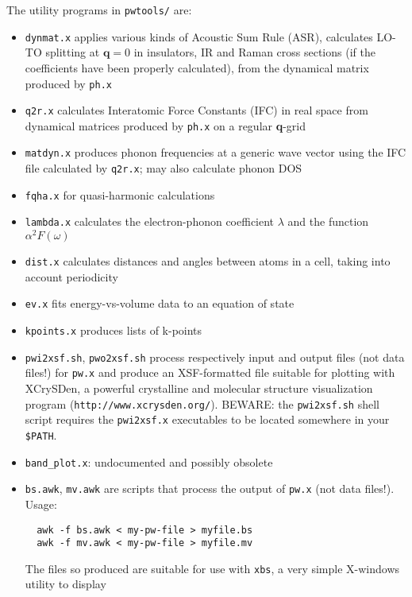 \documentclass[12pt,a4paper]{article}
\begin{document}
The utility programs in \texttt{pwtools/} are:
\begin{itemize}
  \item \texttt{dynmat.x} applies various kinds of Acoustic Sum Rule
        (ASR), calculates LO-TO splitting at $\mathbf{q}=0$ in 
        insulators, IR and Raman cross sections (if the coefficients
        have been properly calculated), from the dynamical matrix
        produced by \texttt{ph.x}
  \item \texttt{q2r.x} calculates Interatomic Force Constants (IFC) in
        real space from dynamical matrices produced by
        \texttt{ph.x} on a regular \textbf{q}-grid
  \item \texttt{matdyn.x} produces phonon frequencies at a generic
        wave vector using the IFC file calculated by \texttt{q2r.x}; 
        may also calculate phonon DOS
  \item \texttt{fqha.x} for quasi-harmonic calculations
  \item \texttt{lambda.x} calculates the electron-phonon coefficient
        $\lambda$ and the function $\alpha^2F(\omega)$
  \item \texttt{dist.x} calculates distances and angles between
        atoms in a cell, taking into account periodicity
  \item \texttt{ev.x} fits energy-vs-volume data to an equation of
        state
  \item \texttt{kpoints.x} produces lists of k-points
  \item \texttt{pwi2xsf.sh}, \texttt{pwo2xsf.sh} process
        respectively input and output files (not data files!) for
        \texttt{pw.x} and produce an XSF-formatted file suitable
        for plotting with XCrySDen, a powerful crystalline and
        molecular structure visualization program 
        (\texttt{http://www.xcrysden.org/}).
        BEWARE: the \texttt{pwi2xsf.sh} shell script requires the
        \texttt{pwi2xsf.x} executables to be located somewhere in
        your \texttt{\$PATH}.
  \item \texttt{band\_plot.x}: undocumented and possibly obsolete
  \item \texttt{bs.awk}, \texttt{mv.awk} are scripts that process
        the output of \texttt{pw.x} (not data files!).
        Usage:
\begin{verbatim}
  awk -f bs.awk < my-pw-file > myfile.bs
  awk -f mv.awk < my-pw-file > myfile.mv
\end{verbatim}
        The files so produced are suitable for use with
        \texttt{xbs}, a very simple X-windows utility to display

\end{itemize}
\end{document}
